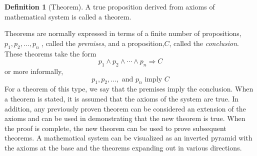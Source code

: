 \documentclass[10pt,]{book}
\theoremstyle{plain}
\theoremstyle{definition}
\newtheorem{definition}[theorem]{Definition}
\theoremstyle{definition}
\theoremstyle{definition}
\theoremstyle{definition}
\begin{document}
\begin{definition}[Theorem]\label{def-theorem}
A true proposition derived from axioms of mathematical system is called a theorem.%
\end{definition}
\par
Theorems are normally expressed in terms of a finite number of propositions, \(p_1, p_2, . . . ,p_n\) , called the \emph{ premises}, and a proposition,\(C\), called the \emph{conclusion}. These theorems take the form
\begin{equation*}p_1\land  p_2\land  \cdots  \land p_n\Rightarrow C\end{equation*}
 or more informally,
\begin{equation*}p_1, p_2, . . . , \textrm{ and } p_n \textrm{ imply } C\end{equation*}
For a theorem of this type, we say that the premises imply the conclusion. When a theorem is stated, it is assumed that the axioms of the system are true. In addition, any previously proven theorem can be considered an extension of the axioms and can be used in demonstrating that the new theorem is true. When the proof is complete, the new theorem can be used to prove subsequent theorems. A mathematical system can be visualized as an inverted pyramid with the axioms at the base and the theorems expanding out in various directions.%
\leavevmode%
\end{document}
